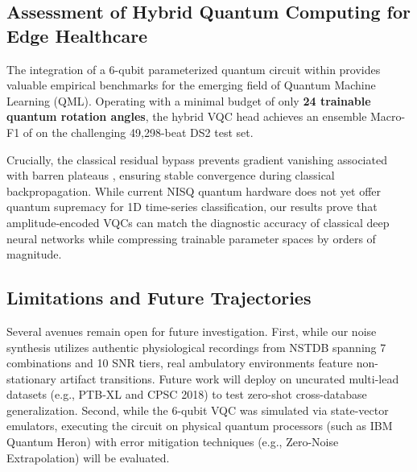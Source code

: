 \subsection{Assessment of Hybrid Quantum Computing for Edge Healthcare}
The integration of a 6-qubit parameterized quantum circuit within \RRN{} provides valuable empirical benchmarks for the emerging field of Quantum Machine Learning (QML). Operating with a minimal budget of only \textbf{24 trainable quantum rotation angles}, the hybrid VQC head achieves an ensemble Macro-F1 of  on the challenging 49{,}298-beat DS2 test set. 

Crucially, the classical residual bypass prevents gradient vanishing associated with barren plateaus \cite{mcclean2018}, ensuring stable convergence during classical backpropagation. While current NISQ quantum hardware does not yet offer quantum supremacy for 1D time-series classification, our results prove that amplitude-encoded VQCs can match the diagnostic accuracy of classical deep neural networks while compressing trainable parameter spaces by orders of magnitude.

\subsection{Limitations and Future Trajectories}
Several avenues remain open for future investigation. First, while our noise synthesis utilizes authentic physiological recordings from NSTDB spanning 7 combinations and 10 SNR tiers, real ambulatory environments feature non-stationary artifact transitions. Future work will deploy \HSL{} on uncurated multi-lead datasets (e.g., PTB-XL and CPSC 2018) to test zero-shot cross-database generalization. Second, while the 6-qubit VQC was simulated via state-vector emulators, executing the circuit on physical quantum processors (such as IBM Quantum Heron) with error mitigation techniques (e.g., Zero-Noise Extrapolation) will be evaluated.
